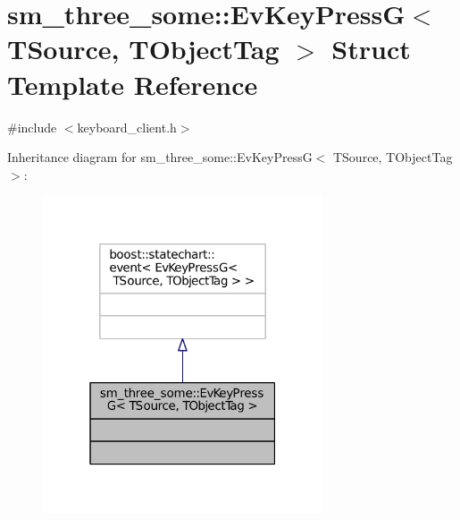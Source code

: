 \hypertarget{structsm__three__some_1_1EvKeyPressG}{}\section{sm\+\_\+three\+\_\+some\+:\+:Ev\+Key\+PressG$<$ T\+Source, T\+Object\+Tag $>$ Struct Template Reference}
\label{structsm__three__some_1_1EvKeyPressG}


{\ttfamily \#include $<$keyboard\+\_\+client.\+h$>$}



Inheritance diagram for sm\+\_\+three\+\_\+some\+:\+:Ev\+Key\+PressG$<$ T\+Source, T\+Object\+Tag $>$\+:
\nopagebreak
\begin{figure}[H]
\begin{center}
\leavevmode
\includegraphics[width=235pt]{structsm__three__some_1_1EvKeyPressG__inherit__graph}
\end{center}
\end{figure}


